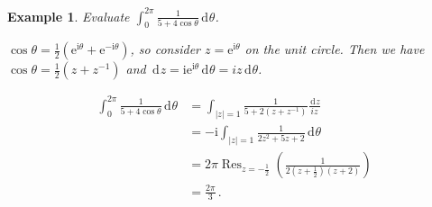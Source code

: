 \documentclass{article}
\theoremstyle{plain}\theoremheaderfont{\normalfont\itshape}\theorembodyfont{\rmfamily}\theoremseparator{.}\newtheorem*{rem}{Remark}\newtheorem*{ex}{Example}\newtheorem*{proof}{Proof}\newtheorem*{altp}{Alternative proof}\newtheorem*{con}{Consequences}\newtheorem*{notn}{Notations}\newtheorem*{cau}{Caution}\newtheorem*{term}{Terminology}\newtheorem*{keyex}{Key example}
\theoremstyle{plain}\theoremheaderfont{\normalfont\bfseries}\theorembodyfont{\rmfamily}\theoremseparator{.}\newtheorem{thm}{Theorem}[section]\newtheorem{lem}[thm]{Lemma}\newtheorem{prop}[thm]{Proposition}\newtheorem*{cor}{Corollary}\newtheorem{defn}[thm]{Definition}\newtheorem{clm}[thm]{Claim}\newtheorem{clminproof}{Claim}\newtheorem{leminproof}{Lemma}\newtheorem{app}{Application}
\theoremstyle{break}\theoremheaderfont{\normalfont\itshape}\theorembodyfont{\rmfamily}\theoremseparator{.\medskip}\newtheorem*{proofskip}{Proof}\newtheorem*{exs}{Examples}\newtheorem*{rems}{Remarks}\newtheorem*{rec}{Recall}\newtheorem*{ppts}{Properties}
\theoremstyle{break}\theoremheaderfont{\normalfont\bfseries}\theorembodyfont{\rmfamily}\theoremseparator{.\medskip}\newtheorem{lemskip}[thm]{Lemma}\newtheorem{defnskip}[thm]{Definition}\newtheorem{propskip}[thm]{Proposition}\newtheorem{thmskip}[thm]{Theorem}
\numberwithin{equation}{section}
\newcommand{\ii}{\mathrm{i}}
\newcommand{\ee}{\mathrm{e}}
\DeclareMathOperator*{\Res}{Res}
\newcommand{\abs}[1]{\left|#1\right|}
\newcommand{\dd}[2][]{\,\mathrm{d}^{#1} #2}
\begin{document}
    \begin{ex}
        Evaluate \(\int_{0}^{2\pi}\frac{1}{5+4\cos\theta}\dd{\theta}\).

        \(\cos\theta=\frac{1}{2}(\ee^{\ii \theta}+\ee^{-\ii \theta})\), so consider \(z=\ee^{\ii \theta}\) on the unit circle. Then we have \(\cos\theta=\frac{1}{2}(z+z^{-1})\) and \(\dd{z}=\ii\ee^{\ii \theta}\dd{\theta}=iz\dd{\theta}\).

        \begin{align*}
            \int_{0}^{2\pi}\frac{1}{5+4\cos\theta}\dd{\theta}&=\int_{\abs{z}=1}\frac{1}{5+2(z+z^{-1})}\frac{\dd{z}}{iz}\\
            &=-\ii\int_{\abs{z}=1}\frac{1}{2z^2+5z+2}\dd{\theta}\\
            &=2\pi\Res_{z=-\frac{1}{2}}\left(\frac{1}{2(z+\frac{1}{2})(z+2)}\right)\\
            &=\frac{2\pi}{3}\,.
        \end{align*}
    \end{ex}
\end{document}
